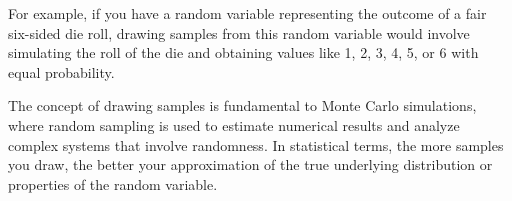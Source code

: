 \documentclass{tufte-handout}
\begin{document}
For example, if you have a random variable representing the outcome of a fair six-sided die roll, drawing samples from this random variable would involve simulating the roll of the die and obtaining values like 1, 2, 3, 4, 5, or 6 with equal probability.

The concept of drawing samples is fundamental to Monte Carlo simulations, where random sampling is used to estimate numerical results and analyze complex systems that involve randomness. In statistical terms, the more samples you draw, the better your approximation of the true underlying distribution or properties of the random variable.
\end{document}
